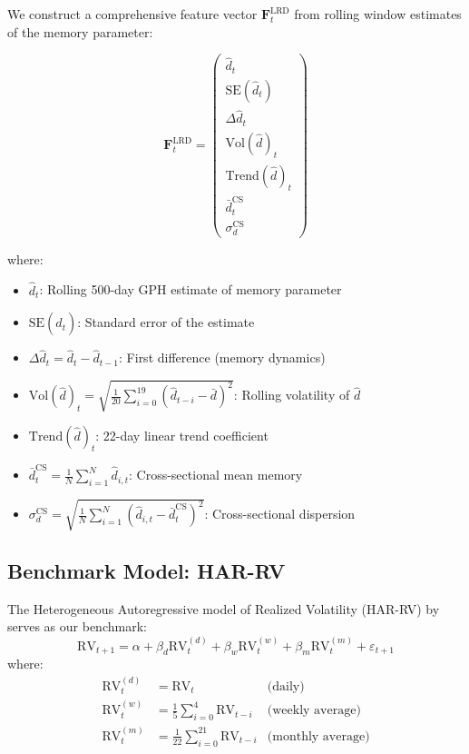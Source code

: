\documentclass[12pt,a4paper]{article}
\newcommand{\RV}{\text{RV}}
\begin{document}
We construct a comprehensive feature vector $\mathbf{F}_t^{\text{LRD}}$ from rolling window estimates of the memory parameter:

\begin{equation}
    \mathbf{F}_t^{\text{LRD}} = \begin{pmatrix}
        \hat{d}_t \\
        \text{SE}(\hat{d}_t) \\
        \Delta\hat{d}_t \\
        \text{Vol}(\hat{d})_t \\
        \text{Trend}(\hat{d})_t \\
        \bar{d}_t^{\text{CS}} \\
        \sigma_d^{\text{CS}}
    \end{pmatrix}
\end{equation}

where:
\begin{itemize}
    \item $\hat{d}_t$: Rolling 500-day GPH estimate of memory parameter
    \item $\text{SE}(\hat{d}_t)$: Standard error of the estimate
    \item $\Delta\hat{d}_t = \hat{d}_t - \hat{d}_{t-1}$: First difference (memory dynamics)
    \item $\text{Vol}(\hat{d})_t = \sqrt{\frac{1}{20}\sum_{i=0}^{19}(\hat{d}_{t-i} - \bar{d})^2}$: Rolling volatility of $\hat{d}$
    \item $\text{Trend}(\hat{d})_t$: 22-day linear trend coefficient
    \item $\bar{d}_t^{\text{CS}} = \frac{1}{N}\sum_{i=1}^N \hat{d}_{i,t}$: Cross-sectional mean memory
    \item $\sigma_d^{\text{CS}} = \sqrt{\frac{1}{N}\sum_{i=1}^N (\hat{d}_{i,t} - \bar{d}_t^{\text{CS}})^2}$: Cross-sectional dispersion
\end{itemize}

\subsection{Benchmark Model: HAR-RV}

The Heterogeneous Autoregressive model of Realized Volatility (HAR-RV) by \citet{corsi2009simple} serves as our benchmark:
\begin{equation}
    \RV_{t+1} = \alpha + \beta_d \RV_t^{(d)} + \beta_w \RV_t^{(w)} + \beta_m \RV_t^{(m)} + \varepsilon_{t+1}
\end{equation}
where:
\begin{align}
    \RV_t^{(d)} &= \RV_t & \text{(daily)} \\
    \RV_t^{(w)} &= \frac{1}{5}\sum_{i=0}^{4} \RV_{t-i} & \text{(weekly average)} \\
    \RV_t^{(m)} &= \frac{1}{22}\sum_{i=0}^{21} \RV_{t-i} & \text{(monthly average)}
\end{align}
\end{document}
